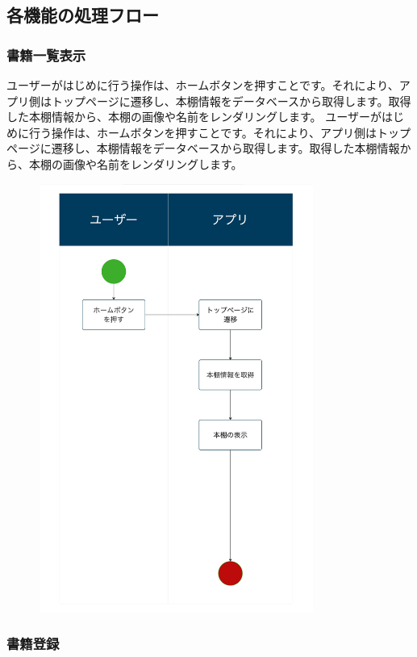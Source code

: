 \documentclass[a4paper, 11pt, titlepage]{jsarticle}
\begin{document}
\clearpage
\subsection{各機能の処理フロー}
\subsubsection{書籍一覧表示}
ユーザーがはじめに行う操作は、ホームボタンを押すことです。それにより、アプリ側はトップページに遷移し、本棚情報をデータベースから取得します。取得した本棚情報から、本棚の画像や名前をレンダリングします。
ユーザーがはじめに行う操作は、ホームボタンを押すことです。それにより、アプリ側はトップページに遷移し、本棚情報をデータベースから取得します。取得した本棚情報から、本棚の画像や名前をレンダリングします。
\begin{figure}[htbp]
  \centering
  \includegraphics[width=90mm]{flow-ichiran.jpg}
  \label{fig:func}
\end{figure}

\clearpage
\subsubsection{書籍登録}
\end{document}
